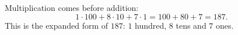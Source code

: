Multiplication comes before addition:
\[1\cdot100+8\cdot10+7\cdot1=100+80+7=\boxed{187}.\]
This is the expanded form of $187$: $1$ hundred, $8$ tens and $7$ ones.
